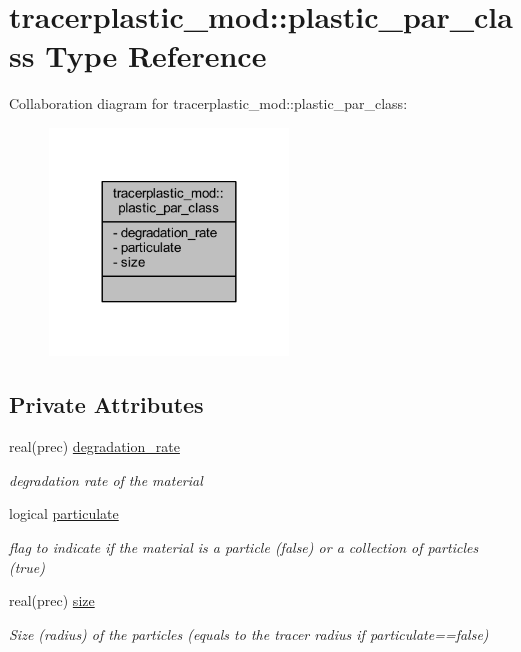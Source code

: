 \hypertarget{structtracerplastic__mod_1_1plastic__par__class}{}\section{tracerplastic\+\_\+mod\+:\+:plastic\+\_\+par\+\_\+class Type Reference}
\label{structtracerplastic__mod_1_1plastic__par__class}


Collaboration diagram for tracerplastic\+\_\+mod\+:\+:plastic\+\_\+par\+\_\+class\+:\nopagebreak
\begin{figure}[H]
\begin{center}
\leavevmode
\includegraphics[width=180pt]{structtracerplastic__mod_1_1plastic__par__class__coll__graph}
\end{center}
\end{figure}
\subsection*{Private Attributes}
\begin{DoxyCompactItemize}
\item 
real(prec) \mbox{\hyperlink{structtracerplastic__mod_1_1plastic__par__class_a1d8b43b7ad8d63a61c079dfd0bd9e972}{degradation\+\_\+rate}}
\begin{DoxyCompactList}\small\item\em degradation rate of the material \end{DoxyCompactList}\item 
logical \mbox{\hyperlink{structtracerplastic__mod_1_1plastic__par__class_a013591d7351786219189b294fae263b9}{particulate}}
\begin{DoxyCompactList}\small\item\em flag to indicate if the material is a particle (false) or a collection of particles (true) \end{DoxyCompactList}\item 
real(prec) \mbox{\hyperlink{structtracerplastic__mod_1_1plastic__par__class_a0dd25951e4670cedda088f8a6833ad1b}{size}}
\begin{DoxyCompactList}\small\item\em Size (radius) of the particles (equals to the tracer radius if particulate==false) \end{DoxyCompactList}\end{DoxyCompactItemize}


